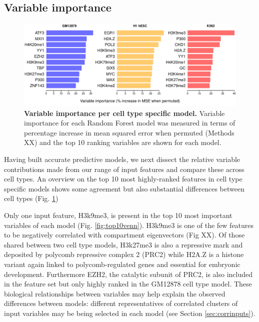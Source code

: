 \documentclass[a4paper,11pt,oneside]{book}
\begin{document}
\subsection{Variable importance}

\begin{figure}
\begin{center} 
\includegraphics[width=\textwidth]{figs/varimp.pdf}
\captionsetup{width=\textwidth} 
\caption{ {\bf Variable importance per cell type specific model. }
Variable importance for each Random Forest model was measured in terms of percentage increase in mean squared error when permuted (Methods XX) and the top 10 ranking variables are shown for each model.
}\label{fig:varimp}
\end{center} 
\end{figure} 

Having built accurate predictive models, we next dissect the relative variable contributions made from our range of input features and compare these across cell types. An overview on the top 10 most highly-ranked features in cell type specific models shows some agreement but also substantial differences between cell types (Fig. \ref{fig:varimp})

Only one input feature, H3k9me3, is present in the top 10 most important variables of each model (Fig. \ref{fig:top10venn}). H3k9me3 is one of the few features to be negatively correlated with compartment eigenvectors (Fig XX). Of those shared between two cell type models, H3k27me3 is also a repressive mark and deposited by polycomb repressive complex 2 (PRC2)\cite{Vizan2014} while H2A.Z is a histone variant again linked to polycomb-regulated genes and essential for embryonic development.\cite{Creyghton2008} Furthermore EZH2, the catalytic subunit of PRC2,\cite{Deb2014} is also included in the feature set but only highly ranked in the GM12878 cell type model. These biological relationships between variables may help explain the observed differences between models: different representatives of correlated clusters of input variables may be being selected in each model (see Section \ref{sec:corrinputs}).
\end{document}
